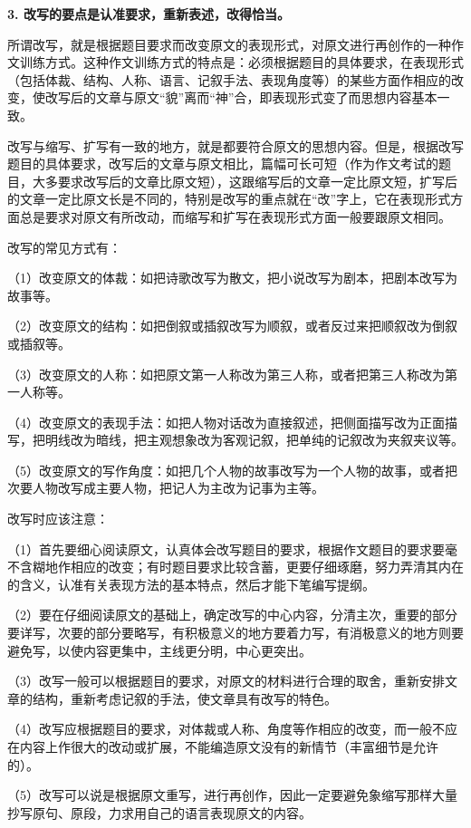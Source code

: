\textbf{3. 改写的要点是认准要求，重新表述，改得恰当。}

所谓改写，就是根据题目要求而改变原文的表现形式，对原文进行再创作的一种作文训练方式。这种作文训练方式的特点是：必须根据题目的具体要求，在表现形式（包括体裁、结构、人称、语言、记叙手法、表现角度等）的某些方面作相应的改变，使改写后的文章与原文“貌”离而“神”合，即表现形式变了而思想内容基本一致。

改写与缩写、扩写有一致的地方，就是都要符合原文的思想内容。但是，根据改写题目的具体要求，改写后的文章与原文相比，篇幅可长可短（作为作文考试的题目，大多要求改写后的文章比原文短），这跟缩写后的文章一定比原文短，扩写后的文章一定比原文长是不同的，特别是改写的重点就在“改”字上，它在表现形式方面总是要求对原文有所改动，而缩写和扩写在表现形式方面一般要跟原文相同。

改写的常见方式有：

（1）改变原文的体裁：如把诗歌改写为散文，把小说改写为剧本，把剧本改写为故事等。

（2）改变原文的结构：如把倒叙或插叙改写为顺叙，或者反过来把顺叙改为倒叙或插叙等。

（3）改变原文的人称：如把原文第一人称改为第三人称，或者把第三人称改为第一人称等。

（4）改变原文的表现手法：如把人物对话改为直接叙述，把侧面描写改为正面描写，把明线改为暗线，把主观想象改为客观记叙，把单纯的记叙改为夹叙夹议等。

（5）改变原文的写作角度：如把几个人物的故事改写为一个人物的故事，或者把次要人物改写成主要人物，把记人为主改为记事为主等。

改写时应该注意：

（1）首先要细心阅读原文，认真体会改写题目的要求，根据作文题目的要求要毫不含糊地作相应的改变；有时题目要求比较含蓄，更要仔细琢磨，努力弄清其内在的含义，认准有关表现方法的基本特点，然后才能下笔编写提纲。

（2）要在仔细阅读原文的基础上，确定改写的中心内容，分清主次，重要的部分要详写，次要的部分要略写，有积极意义的地方要着力写，有消极意义的地方则要避免写，以使内容更集中，主线更分明，中心更突出。

（3）改写一般可以根据题目的要求，对原文的材料进行合理的取舍，重新安排文章的结构，重新考虑记叙的手法，使文章具有改写的特色。

（4）改写应根据题目的要求，对体裁或人称、角度等作相应的改变，而一般不应在内容上作很大的改动或扩展，不能编造原文没有的新情节（丰富细节是允许的）。

（5）改写可以说是根据原文重写，进行再创作，因此一定要避免象缩写那样大量抄写原句、原段，力求用自己的语言表现原文的内容。

